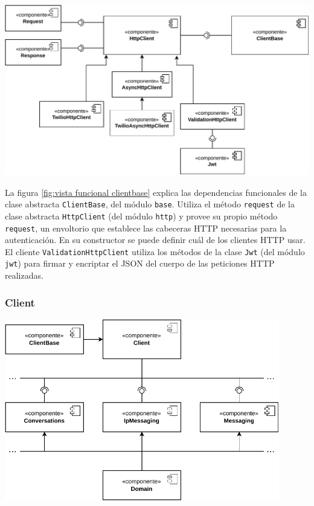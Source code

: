\documentclass{article}
\begin{document}
\begin{center}
  \includegraphics[width=\textwidth]{VistaFuncionalClienteBase.pdf}
  \label{fig:vista funcional clientbase}
\end{center}

\hfill

La figura \ref{fig:vista funcional clientbase}
explica las dependencias funcionales de
la clase abstracta \verb|ClientBase|,
del módulo \verb|base|.
Utiliza el método \verb|request|
de la clase abstracta \verb|HttpClient|
(del módulo \verb|http|)
y provee su propio método \verb|request|,
un envoltorio que establece las cabeceras HTTP necesarias para la autenticación.
En su constructor se puede definir cuál de los clientes HTTP usar.
El cliente \verb|ValidationHttpClient|
utiliza los métodos de la clase \verb|Jwt|
(del módulo \verb|jwt|)
para firmar y encriptar el JSON del cuerpo
de las peticiones HTTP realizadas.

\subsubsection{Client}

\hfill

\begin{center}
  \includegraphics[width=0.9\textwidth]{VistaFuncionalCliente.pdf}
  \label{fig:vista funcional client}
\end{center}
\end{document}

